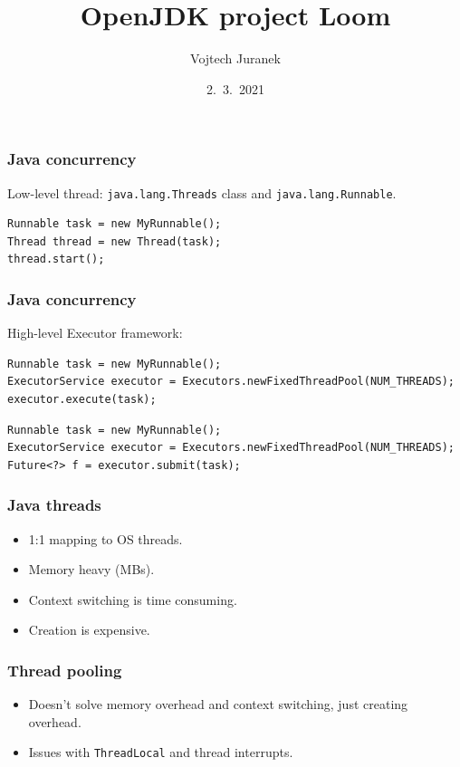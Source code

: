 \documentclass[10pt,utf8]{beamer}
\title{OpenJDK project Loom}
\author{Vojtech Juranek}
\institute[Red Hat]{oVirt storage team}
\date{2.~3.~2021}
\begin{document}
\begin{frame}
	\titlepage
\end{frame}

\begin{frame}[fragile]
    \frametitle{Java concurrency}
    Low-level thread: \texttt{java.lang.Threads} class and \texttt{java.lang.Runnable}.
    \begin{lstlisting}[style=java]
Runnable task = new MyRunnable();
Thread thread = new Thread(task);
thread.start();
    \end{lstlisting}
\end{frame}

\begin{frame}[fragile]
    \frametitle{Java concurrency}
    High-level Executor framework:
    \begin{lstlisting}[style=java]
Runnable task = new MyRunnable();
ExecutorService executor = Executors.newFixedThreadPool(NUM_THREADS);
executor.execute(task);
    \end{lstlisting}
    
    \vspace{0.5cm}
    \begin{lstlisting}[style=java]
Runnable task = new MyRunnable();
ExecutorService executor = Executors.newFixedThreadPool(NUM_THREADS);
Future<?> f = executor.submit(task);
    \end{lstlisting}
\end{frame}

\begin{frame}
    \frametitle{Java threads}
    \begin{itemize}
        \item 1:1 mapping to OS threads.
        \item Memory heavy (MBs).
        \item Context switching is time consuming.
        \item Creation is expensive.
    \end{itemize}
\end{frame}

\begin{frame}
    \frametitle{Thread pooling}
    \begin{itemize}
        \item Doesn't solve memory overhead and context switching, just creating overhead.
        \item Issues with \texttt{ThreadLocal} and thread interrupts.
    \end{itemize}
\end{frame}
\end{document}
